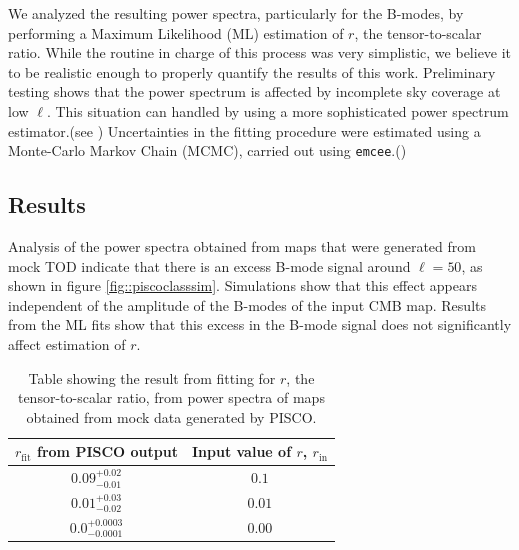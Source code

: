 \documentclass[a4paper,fleqn]{cas-dc}\sloppy
\begin{document}
We analyzed the resulting power spectra, particularly for the B-modes, by performing a Maximum Likelihood (ML) estimation of $r$, the tensor-to-scalar ratio. While the routine in charge of this process was very simplistic, we believe it to be realistic enough to properly quantify the results of this work. Preliminary testing shows that the power spectrum is affected by incomplete sky coverage at low $\ell$. This situation can handled by using a more sophisticated power spectrum estimator.(see \cite{2015ApJ...814..103W} ) Uncertainties in the fitting procedure were estimated using a Monte-Carlo Markov Chain (MCMC), carried out using \texttt{emcee}.(\cite{emcee})

\subsection{Results}

Analysis of the power spectra obtained from maps that were generated from mock TOD indicate that there is an excess B-mode signal around $\ell=50$, as shown in figure \ref{fig::piscoclasssim}. Simulations show that this effect appears independent of the amplitude of the B-modes of the input CMB map. Results from the ML fits show that this excess in the B-mode signal does not significantly affect estimation of $r$.

\begin{table}[width=1\linewidth,cols=2,pos=h]
	\caption{Table showing the result from fitting for $r$, the tensor-to-scalar ratio, from power spectra of maps obtained from mock data generated by PISCO. }
	\label{table::pisco_fits}
	\begin{tabular*}{\tblwidth}{@{} CC@{} }
		\toprule
		$r_\mathrm{fit}$ from PISCO output & Input value of $r$, $r_{\mathrm{in}}$ \\
		\midrule
		$0.09^{+0.02}_{-0.01}$ & $0.1$ \\
		$0.01^{+0.03}_{-0.02}$ & $0.01$ \\
		$0.0^{+0.0003}_{-0.0001}$ & $0.00$ \\ 
		\bottomrule
	\end{tabular*}
\end{table}
\end{document}
